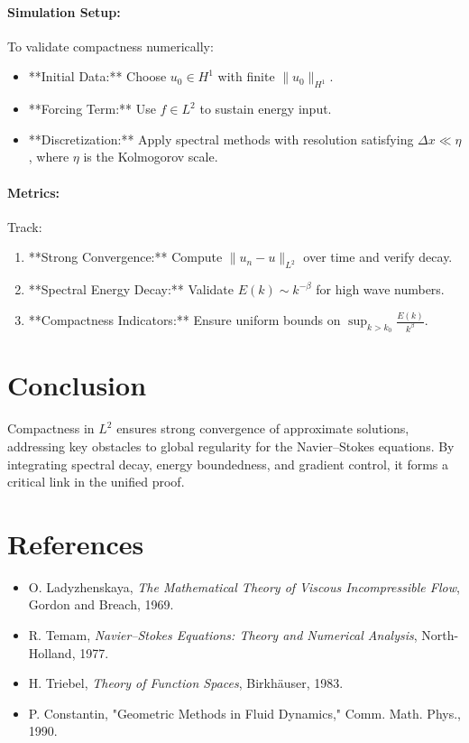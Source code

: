 \documentclass[12pt]{article}
\theoremstyle{definition}
\begin{document}
\paragraph{Simulation Setup:}
To validate compactness numerically:
\begin{itemize}
    \item **Initial Data:** Choose $u_0 \in H^1$ with finite $\|u_0\|_{H^1}$.
    \item **Forcing Term:** Use $f \in L^2$ to sustain energy input.
    \item **Discretization:** Apply spectral methods with resolution satisfying $\Delta x \ll \eta$, where $\eta$ is the Kolmogorov scale.
\end{itemize}

\paragraph{Metrics:}
Track:
\begin{enumerate}
    \item **Strong Convergence:** Compute $\|u_n - u\|_{L^2}$ over time and verify decay.
    \item **Spectral Energy Decay:** Validate $E(k) \sim k^{-\beta}$ for high wave numbers.
    \item **Compactness Indicators:** Ensure uniform bounds on $\sup_{k > k_0} \frac{E(k)}{k^\beta}$.
\end{enumerate}

\section*{Conclusion}
Compactness in $L^2$ ensures strong convergence of approximate solutions, addressing key obstacles to global regularity for the Navier--Stokes equations. By integrating spectral decay, energy boundedness, and gradient control, it forms a critical link in the unified proof.

\section*{References}
\begin{itemize}
    \item O. Ladyzhenskaya, \emph{The Mathematical Theory of Viscous Incompressible Flow}, Gordon and Breach, 1969.
    \item R. Temam, \emph{Navier--Stokes Equations: Theory and Numerical Analysis}, North-Holland, 1977.
    \item H. Triebel, \emph{Theory of Function Spaces}, Birkh\"auser, 1983.
    \item P. Constantin, "Geometric Methods in Fluid Dynamics," Comm. Math. Phys., 1990.
\end{itemize}
\end{document}
